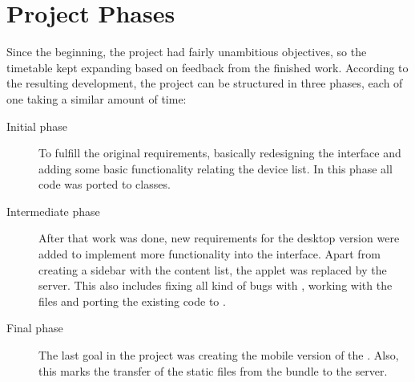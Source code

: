 \section{Project Phases} %
\label{sec:phases}

Since the beginning, the project had fairly unambitious objectives, so the timetable kept expanding based on feedback from the finished work.
According to the resulting development, the project can be structured in three phases, each of one taking a similar amount of time:

\begin{description}
  \item[Initial phase] To fulfill the original requirements, basically redesigning the  interface and adding some basic functionality relating the device list.
  In this phase all  code was ported to  classes.
  \item[Intermediate phase] After that work was done, new requirements for the desktop version were added to implement more functionality into the  interface.
  Apart from creating a sidebar with the content list, the applet was replaced by the  server.
  This also includes fixing all kind of bugs with , working with the  files and porting the existing  code to .
  \item[Final phase] The last goal in the project was creating the mobile version of the .
  Also, this marks the transfer of the static files from the  bundle to the  server.
\end{description}

